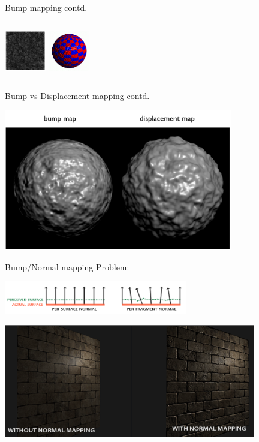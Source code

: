 \documentclass[9pt]{beamer}
\begin{document}
\begin{frame}{Bump mapping contd.}
\begin{columns}[t]
\begin{column}{7cm}
\begin{center}
				\includegraphics[width=1.8cm]{slike/bump_02_02.png}
				\includegraphics[width=1.8cm]{slike/bump_03_03.png}
			\end{center}
		\end{column}
	\end{columns}
\end{frame}

\begin{frame}{Bump vs Displacement mapping contd.}
	\begin{center}
		\includegraphics[width=10cm]{slike/03_bump_vs_displacement_mapping_a.png}
	\end{center}
\end{frame}



\begin{frame}{Bump/Normal mapping}
	Problem:
	\begin{center}
		\includegraphics[width=8cm]{slike/normal_mapping_surfaces.png}
	\end{center}
	\begin{center}
	\includegraphics[width=11cm]{slike/normal_mapping_compare.png}
	\end{center}
\end{frame}
\end{document}
